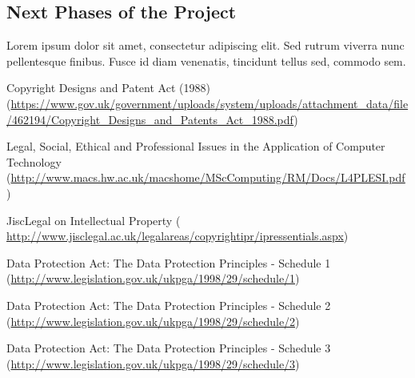 \documentclass[a4paper, 12pt, titlepage]{article}
\begin{document}
\subsection*{Next Phases of the Project}
Lorem ipsum dolor sit amet, consectetur adipiscing elit. Sed rutrum viverra nunc pellentesque finibus. Fusce id diam venenatis, tincidunt tellus sed, commodo sem.

\newpage
\begin{thebibliography}{99}

 Copyright Designs and Patent Act (1988)
\newline
(\url{https://www.gov.uk/government/uploads/system/uploads/attachment_data/file/462194/Copyright_Designs_and_Patents_Act_1988.pdf})

 Legal, Social, Ethical and Professional Issues in the Application of Computer Technology 
\newline
(\url{http://www.macs.hw.ac.uk/macshome/MScComputing/RM/Docs/L4PLESI.pdf})

 JiscLegal on Intellectual Property
\newline
(\url{ http://www.jisclegal.ac.uk/legalareas/copyrightipr/ipressentials.aspx})

 Data Protection Act: The Data Protection Principles - Schedule 1
\newline
(\url{http://www.legislation.gov.uk/ukpga/1998/29/schedule/1})

 Data Protection Act: The Data Protection Principles - Schedule 2
\newline
(\url{http://www.legislation.gov.uk/ukpga/1998/29/schedule/2})

 Data Protection Act: The Data Protection Principles - Schedule 3
\newline
(\url{http://www.legislation.gov.uk/ukpga/1998/29/schedule/3})

\end{thebibliography}
\end{document}
